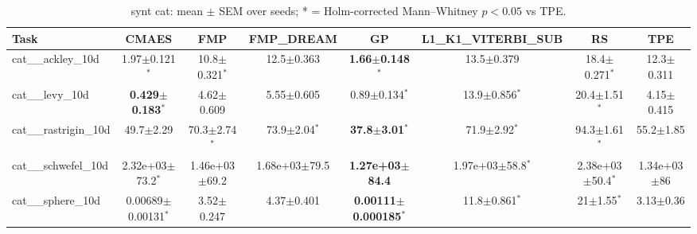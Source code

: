 \begin{table}[t]
\caption{synt cat: mean $\pm$ SEM over seeds; * = Holm-corrected Mann--Whitney $p<0.05$ vs TPE.}
\label{tab:synt_cat}
\begin{center}\small
\begin{tabular}{lccccccc}
\hline
Task & CMAES & FMP & FMP\_DREAM & GP & L1\_K1\_VITERBI\_SUB & RS & TPE \\
\hline
cat\_\_ackley\_10d & 1.97$\pm$0.121$^{*}$ & 10.8$\pm$0.321$^{*}$ & 12.5$\pm$0.363 & \textbf{1.66$\pm$0.148}$^{*}$ & 13.5$\pm$0.379 & 18.4$\pm$0.271$^{*}$ & 12.3$\pm$0.311 \\
cat\_\_levy\_10d & \textbf{0.429$\pm$0.183}$^{*}$ & 4.62$\pm$0.609 & 5.55$\pm$0.605 & 0.89$\pm$0.134$^{*}$ & 13.9$\pm$0.856$^{*}$ & 20.4$\pm$1.51$^{*}$ & 4.15$\pm$0.415 \\
cat\_\_rastrigin\_10d & 49.7$\pm$2.29 & 70.3$\pm$2.74$^{*}$ & 73.9$\pm$2.04$^{*}$ & \textbf{37.8$\pm$3.01}$^{*}$ & 71.9$\pm$2.92$^{*}$ & 94.3$\pm$1.61$^{*}$ & 55.2$\pm$1.85 \\
cat\_\_schwefel\_10d & 2.32e+03$\pm$73.2$^{*}$ & 1.46e+03$\pm$69.2 & 1.68e+03$\pm$79.5 & \textbf{1.27e+03$\pm$84.4} & 1.97e+03$\pm$58.8$^{*}$ & 2.38e+03$\pm$50.4$^{*}$ & 1.34e+03$\pm$86 \\
cat\_\_sphere\_10d & 0.00689$\pm$0.00131$^{*}$ & 3.52$\pm$0.247 & 4.37$\pm$0.401 & \textbf{0.00111$\pm$0.000185}$^{*}$ & 11.8$\pm$0.861$^{*}$ & 21$\pm$1.55$^{*}$ & 3.13$\pm$0.36 \\
\hline
\end{tabular}
\end{center}
\end{table}